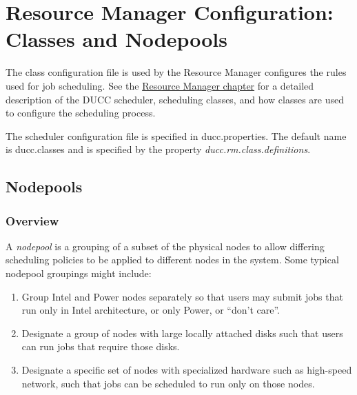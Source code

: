 % 
% 
% 
% 
\section{Resource Manager Configuration: Classes and Nodepools}
\label{sec:ducc.classes}

The class configuration file is used by the Resource Manager configures the rules used for job
scheduling. See the \hyperref[chap:rm]{Resource Manager chapter} for a detailed description of the DUCC
scheduler, scheduling classes, and how classes are used to configure the scheduling process.

The scheduler  configuration file is specified in ducc.properties. The default name is 
ducc.classes and is specified by the property {\em ducc.rm.class.definitions}.
  
\subsection{Nodepools}
\label{subsec:nodepools}

\subsubsection{Overview}
    A {\em nodepool} is a grouping of a subset of the physical nodes to allow differing
    scheduling policies to be applied to different nodes in the system.  Some typical
    nodepool groupings might include:
    \begin{enumerate}
      \item Group Intel and Power nodes separately so that users may submit jobs that run
        only in Intel architecture, or only Power, or ``don't care''.
      \item Designate a group of nodes with large locally attached disks such that users
        can run jobs that require those disks.
      \item Designate a specific set of nodes with specialized hardware such as high-speed
        network, such that jobs can be scheduled to run only on those nodes.
    \end{enumerate}

